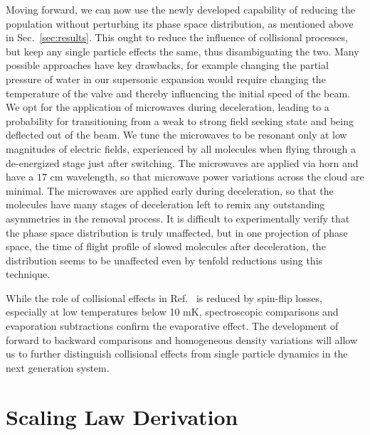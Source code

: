 \documentclass[%
 reprint,
 amsmath,amssymb,
 aps,
pra,
]{revtex4-1}
\begin{document}
Moving forward, we can now use the newly developed capability of reducing the population without perturbing its phase space distribution, as mentioned above in Sec.~\ref{sec:results}.
This ought to reduce the influence of collisional processes, but keep any single particle effects the same, thus disambiguating the two.
Many possible approaches have key drawbacks, for example changing the partial pressure of water in our supersonic expansion would require changing the temperature of the valve and thereby influencing the initial speed of the beam. 
We opt for the application of microwaves during deceleration, leading to a probability for transitioning from a weak to strong field seeking state and being deflected out of the beam.
We tune the microwaves to be resonant only at low magnitudes of electric fields, experienced by all molecules when flying through a de-energized stage just after switching.
The microwaves are applied via horn and have a $17\text{ cm}$ wavelength, so that microwave power variations across the cloud are minimal.
The microwaves are applied early during deceleration, so that the molecules have many stages of deceleration left to remix any outstanding asymmetries in the removal process.
It is difficult to experimentally verify that the phase space distribution is truly unaffected, but in one projection of phase space, the time of flight profile of slowed molecules after deceleration, the distribution seems to be unaffected even by tenfold reductions using this technique.

While the role of collisional effects in Ref.~\cite{Stuhl2012evap} is reduced by spin-flip losses, especially at low temperatures below 10 mK, spectroscopic comparisons and evaporation subtractions confirm the evaporative effect. The development of forward to backward comparisons and homogeneous density variations will allow us to further distinguish collisional effects from single particle dynamics in the next generation system.

\section{Scaling Law Derivation\label{sec:der}}
\end{document}
